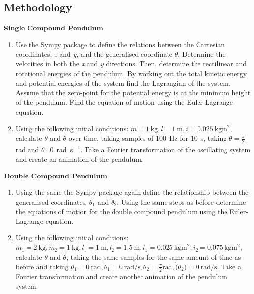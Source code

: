 \documentclass[12pt, a4paper]{article}
\begin{document}
\subsection{Methodology}
\textbf{Single Compound Pendulum}
\begin{enumerate}
    \item Use the Sympy package to define the relations between the Cartesian coordinates, \textit{x} and
    \textit{y}, and the generalised coordinate \textit{\(\theta\)}. Determine the velocities in both the \textit{x} and \textit{y} directions. Then, determine the rectilinear and rotational energies of the pendulum. By working out the total kinetic energy and potential energies of the system find the Lagrangian of the system. Assume that the zero-point for the potential energy is at the minimum height of the pendulum. Find the equation of motion using the Euler-Lagrange equation. 
    \item Using the following initial conditions: \(m = \qty{1}{\kilogram}, l = \qty{1}{\meter}, i = \qty{0.025}{\kilogram\metre\squared}\), calculate \(\theta\) and \(\dot{\theta}\) over time, taking samples of \qty{100}{\hertz} for \qty{10}{\second}, taking \(\theta = \frac{\pi}{2}\)\unit{\radian} and \(\dot{\theta}\)=\qty{0}{\radian\per\second}. Take a Fourier transformation of the oscillating system and create an animation of the pendulum.
\end{enumerate}
\textbf{Double Compound Pendulum}
\begin{enumerate}
    \item Using the same the Sympy package again define the relationship between the generalised coordinates, \(\theta_1\) and \(\theta_2\). Using the same steps as before determine the equations of motion for the double compound pendulum using the Euler-Lagrange equation. 
    \item  Using the following initial conditions: \(m_1 = \qty{2}{\kilogram}, m_2 = \qty{1}{\kilogram}, l_1 = \qty{1}{\meter}, l_2 = \qty{1.5}{\meter}, i_1 = \qty{0.025}{\kilogram\meter\squared}, i_2 = \qty{0.075}{\kilogram\meter\squared}\), calculate \(\theta\) and \(\dot{\theta}\), taking the same samples for the same amount of time as before and taking \(\theta_1 = \qty{0}{\radian}, \dot{\theta_1} = \qty{0}{\radian\per\second}, \theta_2 = \frac{\pi}{2}\unit{\radian}, \dot(\theta_2) = \qty{0}{\radian\per\second}\). Take a Fourier transformation and create another animation of the pendulum system. 
\end{enumerate}
\end{document}
